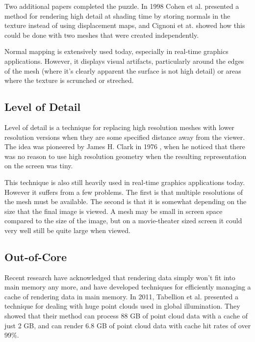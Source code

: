 \documentclass[12pt]{ucthesis}
\begin{document}
Two additional papers completed the puzzle. In 1998 Cohen et al. \cite{cohen:1998}
presented a method for rendering high detail at shading time by storing normals
in the texture instead of using displacement maps, and Cignoni et at. \cite{cignoni:1998}
showed how this could be done with two meshes that were created independently.

Normal mapping is extensively used today, especially in real-time graphics
applications. However, it displays visual artifacts, particularly around the
edges of the mesh (where it's clearly apparent the surface is not high detail)
or areas where the texture is scrunched or streched.

\subsection{Level of Detail}
\label{levelofdetail}

Level of detail is a technique for replacing high resolution meshes with lower
resolution versions when they are some specified distance away from the viewer.
The idea was pioneered by James H. Clark in 1976 \cite{clark:1976}, when he
noticed that there was no reason to use high resolution geometry when the
resulting representation on the screen was tiny.

This technique is also still heavily used in real-time graphics applications
today. However it suffers from a few problems. The first is that multiple
resolutions of the mesh must be available. The second is that it is somewhat
depending on the size that the final image is viewed. A mesh may be small in
screen space compared to the size of the image, but on a movie-theater sized
screen it could very well still be quite large when viewed.

\subsection{Out-of-Core}
\label{outofcore}

Recent research have acknowledged that rendering data simply won't fit into
main memory any more, and have developed techniques for efficiently managing
a cache of rendering data in main memory. In 2011, Tabellion et al. \cite{tabellion:2011}
presented a technique for dealing with huge point clouds used in global
illumination. They showed that their method can process 88 GB of point cloud
data with a cache of just 2 GB, and can render 6.8 GB of point cloud data with
cache hit rates of over 99\%.
\end{document}
